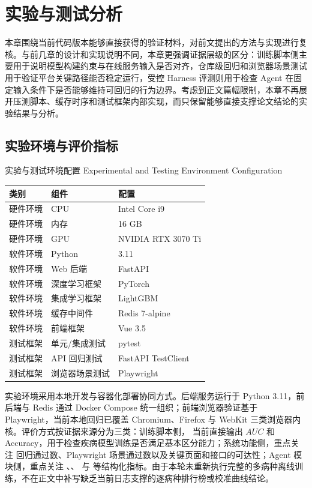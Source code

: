 
\chapter{实验与测试分析}

本章围绕当前代码版本能够直接获得的验证材料，对前文提出的方法与实现进行复核。与前几章的设计和实现说明不同，本章更强调证据层级的区分：训练脚本侧主要用于说明模型构建约束与在线服务输入是否对齐，仓库级回归和浏览器场景测试用于验证平台关键路径能否稳定运行，受控 Harness 评测则用于检查 Agent 在固定输入条件下是否能够维持可回归的行为边界。考虑到正文篇幅限制，本章不再展开压测脚本、缓存时序和测试框架内部实现，而只保留能够直接支撑论文结论的实验结果与分析。

\section{实验环境与评价指标}
\begin{table}[htbp]
\centering
\bitabcaption
    {实验与测试环境配置}
    {Experimental and Testing Environment Configuration}
\label{tab:test_env}
\begin{tabular}{lll}
\toprule
类别 & 组件 & 配置 \\
\midrule
硬件环境 & CPU & Intel Core i9 \\
硬件环境 & 内存 & 16 GB \\
硬件环境 & GPU & NVIDIA RTX 3070 Ti \\
软件环境 & Python & 3.11 \\
软件环境 & Web 后端 & FastAPI \\
软件环境 & 深度学习框架 & PyTorch \\
软件环境 & 集成学习框架 & LightGBM \\
软件环境 & 缓存中间件 & Redis 7-alpine \\
软件环境 & 前端框架 & Vue 3.5 \\
测试框架 & 单元/集成测试 & pytest \\
测试框架 & API 回归测试 & FastAPI TestClient \\
测试框架 & 浏览器场景测试 & Playwright \\
\bottomrule
\end{tabular}
\end{table}

实验环境采用本地开发与容器化部署协同方式。后端服务运行于 Python 3.11，前后端与 Redis 通过 Docker Compose 统一组织；前端浏览器验证基于 Playwright，当前本地回归已覆盖 Chromium、Firefox 与 WebKit 三类浏览器内核。评价方式按证据来源分为三类：训练脚本侧， 当前直接输出 $AUC$ 和 Accuracy，用于检查疾病模型训练是否满足基本区分能力；系统功能侧，重点关注  回归通过数、Playwright 场景通过数以及关键页面和接口的可达性；Agent 模块侧，重点关注 、、 与  等结构化指标。由于本轮未重新执行完整的多病种离线训练，不在正文中补写缺乏当前日志支撑的逐病种排行榜或校准曲线结论。

